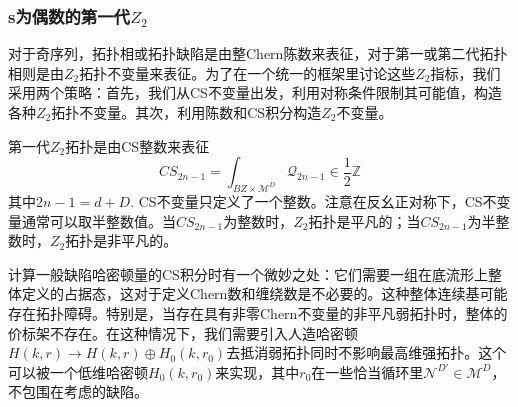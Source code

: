 \documentclass[a4paper]{article}
\numberwithin{equation}{subsection}
\begin{document}
\subsubsection{s为偶数的第一代$Z_2$}
对于奇序列，拓扑相或拓扑缺陷是由整Chern陈数来表征，对于第一或第二代拓扑相则是由$Z_2$拓扑不变量来表征。为了在一个统一的框架里讨论这些$Z_2$指标，我们采用两个策略：首先，我们从CS不变量出发，利用对称条件限制其可能值，构造各种$Z_2$拓扑不变量。其次，利用陈数和CS积分构造$Z_2$不变量。

第一代$Z_2$拓扑是由CS整数来表征
\begin{equation}\label{Z2CS}
    CS_{2n-1}=\int_{BZ\times\mathcal{M}^D}\mathcal{Q}_{2n-1}\in\frac{1}{2}\mathbb{Z}
\end{equation}
其中$2n-1=d+D$. CS不变量只定义了一个整数。注意在反幺正对称下，CS不变量通常可以取半整数值。当$CS_{2n−1}$为整数时，$Z_2$拓扑是平凡的；当$CS_{2n−1}$为半整数时，$Z_2$拓扑是非平凡的。

计算一般缺陷哈密顿量的CS积分时有一个微妙之处：它们需要一组在底流形上整体定义的占据态，这对于定义Chern数和缠绕数是不必要的。这种整体连续基可能存在拓扑障碍。特别是，当存在具有非零Chern不变量的非平凡弱拓扑时，整体的价标架不存在。在这种情况下，我们需要引入人造哈密顿$H(k,r)\rightarrow H(k,r)\oplus H_0(k,r_0)$去抵消弱拓扑同时不影响最高维强拓扑。这个可以被一个低维哈密顿$H_0(k,r_0)$来实现，其中$r_0$在一些恰当循环里$\mathcal{N}^{D'}\in\mathcal{M}^D$，不包围在考虑的缺陷。
\end{document}
